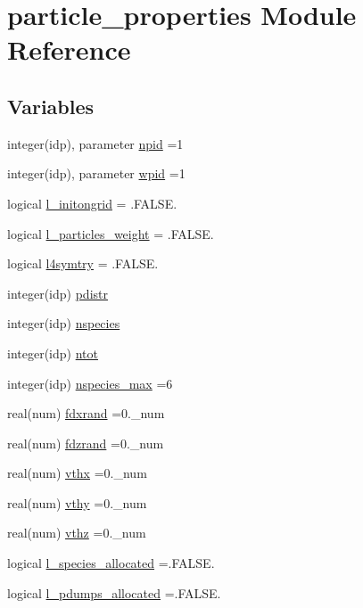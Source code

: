 \hypertarget{namespaceparticle__properties}{}\section{particle\+\_\+properties Module Reference}
\label{namespaceparticle__properties}
\subsection*{Variables}
\begin{DoxyCompactItemize}
\item 
integer(idp), parameter \hyperlink{namespaceparticle__properties_a9a2b5f322610353c06693336b21439f7}{npid} =1
\item 
integer(idp), parameter \hyperlink{namespaceparticle__properties_a9661ac258a1ee308b3cad93e5da3c579}{wpid} =1
\item 
logical \hyperlink{namespaceparticle__properties_ac2f3b846a4154ff9b4cccadaffe4bfa9}{l\+\_\+initongrid} = .F\+A\+L\+S\+E.
\item 
logical \hyperlink{namespaceparticle__properties_a886a9f7d338c6c8fc14d80df9ac732ae}{l\+\_\+particles\+\_\+weight} = .F\+A\+L\+S\+E.
\item 
logical \hyperlink{namespaceparticle__properties_adf7851e9d61da6389c759e11e09d218a}{l4symtry} = .F\+A\+L\+S\+E.
\item 
integer(idp) \hyperlink{namespaceparticle__properties_aaf6c9fb8697f29ccff6e1d82ee7f477a}{pdistr}
\item 
integer(idp) \hyperlink{namespaceparticle__properties_a5aabee3c3d0e9e902989125d50e03426}{nspecies}
\item 
integer(idp) \hyperlink{namespaceparticle__properties_a9fa6e3ec64928bf64db8c78d73f97389}{ntot}
\item 
integer(idp) \hyperlink{namespaceparticle__properties_a7f6d8f4edc23a026743320958d14d534}{nspecies\+\_\+max} =6
\item 
real(num) \hyperlink{namespaceparticle__properties_a68abb05c88189b0d3f2ac02b0bde9d83}{fdxrand} =0.\+\_\+num
\item 
real(num) \hyperlink{namespaceparticle__properties_ac28362a40a4b808ff8ede4d94c4423f3}{fdzrand} =0.\+\_\+num
\item 
real(num) \hyperlink{namespaceparticle__properties_ab09cf3446a6f6d5cc0c600be909db8c1}{vthx} =0.\+\_\+num
\item 
real(num) \hyperlink{namespaceparticle__properties_a6edaa2cc58de2c03d2f9da281f25742a}{vthy} =0.\+\_\+num
\item 
real(num) \hyperlink{namespaceparticle__properties_a7826780fb51369556dcbf7bd63f1ef81}{vthz} =0.\+\_\+num
\item 
logical \hyperlink{namespaceparticle__properties_a3dcd8fa47e189305bb2534a72c4a8d5c}{l\+\_\+species\+\_\+allocated} =.F\+A\+L\+S\+E.
\item 
logical \hyperlink{namespaceparticle__properties_a5ab16464c3ac1b31175817e811763fe1}{l\+\_\+pdumps\+\_\+allocated} =.F\+A\+L\+S\+E.
\end{DoxyCompactItemize}


